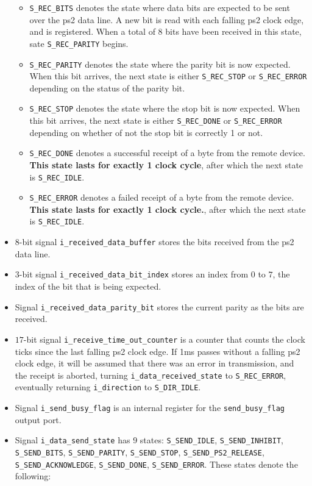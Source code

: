 \documentclass{article}
\begin{document}
\begin{itemize}
\begin{itemize}
	\item \texttt{S\_REC\_BITS} denotes the state where data bits are expected to be sent over the ps2 data line. A new bit is read with each falling ps2 clock edge, and is registered. When a total of 8 bits have been received in this state, sate \texttt{S\_REC\_PARITY} begins. 
	\item \texttt{S\_REC\_PARITY} denotes the state where the parity bit is now expected. When this bit arrives, the next state is either \texttt{S\_REC\_STOP} or \texttt{S\_REC\_ERROR} depending on the status of the parity bit.  
	\item \texttt{S\_REC\_STOP} denotes the state where the stop bit is now expected. When this bit arrives, the next state is either \texttt{S\_REC\_DONE} or \texttt{S\_REC\_ERROR} depending on whether of not the stop bit is correctly 1 or not.
	\item \texttt{S\_REC\_DONE} denotes a successful receipt of a byte from the remote device. {\bf This state lasts for exactly 1 clock cycle}, after which the next state is \texttt{S\_REC\_IDLE}.   
	\item \texttt{S\_REC\_ERROR} denotes a failed receipt of a byte from the remote device. {\bf This state lasts for exactly 1 clock cycle.}, after which the next state is \texttt{S\_REC\_IDLE}. 
	\end{itemize}   
\item \(8\)-bit signal \texttt{i\_received\_data\_buffer} stores the bits received from the ps2 data line. 
\item \(3\)-bit signal \texttt{i\_received\_data\_bit\_index} stores an index from \(0\) to \(7\), the index of the bit that is being expected. 
\item Signal \texttt{i\_received\_data\_parity\_bit} stores the current parity as the bits are received. 
\item \(17\)-bit signal \texttt{i\_receive\_time\_out\_counter} is a counter that counts the clock ticks since the last falling ps2 clock edge. If 1ms passes without a falling ps2 clock edge, it will be assumed that there was an error in transmission, and the receipt is aborted, turning \texttt{i\_data\_received\_state} to \texttt{S\_REC\_ERROR}, eventually returning \texttt{i\_direction} to \texttt{S\_DIR\_IDLE}. 
\item Signal \texttt{i\_send\_busy\_flag} is an internal register for the \texttt{send\_busy\_flag} output port. 
\item Signal \texttt{i\_data\_send\_state} has 9 states: \texttt{S\_SEND\_IDLE}, \texttt{S\_SEND\_INHIBIT}, \texttt{S\_SEND\_BITS}, \texttt{S\_SEND\_PARITY}, \texttt{S\_SEND\_STOP}, \texttt{S\_SEND\_PS2\_RELEASE}, \texttt{S\_SEND\_ACKNOWLEDGE}, \texttt{S\_SEND\_DONE}, \texttt{S\_SEND\_ERROR}. These states denote the following: 

\end{itemize}
\end{document}
